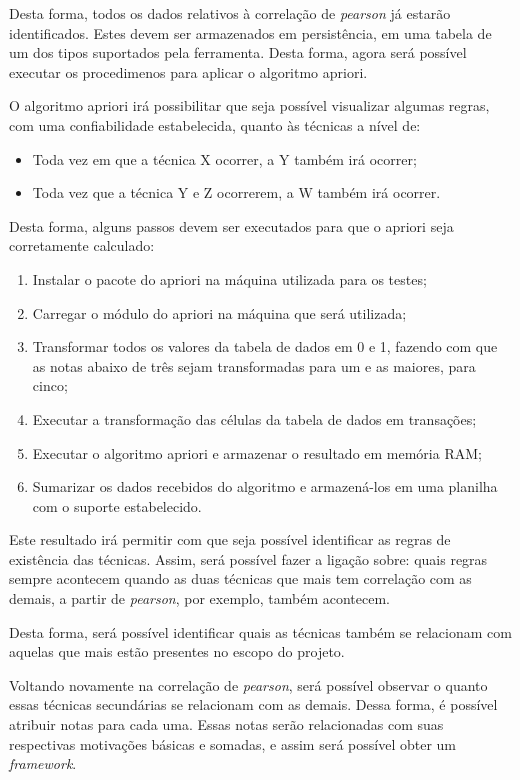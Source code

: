Desta forma, todos os dados relativos à correlação de \textit{pearson} já estarão identificados. Estes devem ser armazenados em persistência,
em uma tabela de um dos tipos suportados pela ferramenta. Desta forma, agora será possível executar os procedimenos para aplicar
o algoritmo apriori.

O algoritmo apriori irá possibilitar que seja possível visualizar algumas regras, com uma confiabilidade estabelecida,
quanto às técnicas a nível de:
\begin{itemize}
    \item Toda vez em que a técnica X ocorrer, a Y também irá ocorrer;
    \item Toda vez que a técnica Y e Z ocorrerem, a W também irá ocorrer.
\end{itemize}

Desta forma, alguns passos devem ser executados para que o apriori seja corretamente calculado:

\begin{enumerate}
    \item Instalar o pacote do apriori na máquina utilizada para os testes;
    \item Carregar o módulo do apriori na máquina que será utilizada;
    \item Transformar todos os valores da tabela de dados em 0 e 1, fazendo com que as notas abaixo de três
        sejam transformadas para um e as maiores, para cinco;
    \item Executar a transformação das células da tabela de dados em transações;
    \item Executar o algoritmo apriori e armazenar o resultado em memória RAM;
    \item Sumarizar os dados recebidos do algoritmo e armazená-los em uma planilha com o suporte
        estabelecido.
\end{enumerate}

Este resultado irá permitir com que seja possível identificar as regras de existência das técnicas. Assim, será possível fazer
a ligação sobre: quais regras sempre acontecem quando as duas técnicas que mais tem correlação com as demais, a partir de \textit{pearson},
por exemplo, também acontecem.


Desta forma, será possível identificar quais as técnicas também se relacionam com aquelas que mais estão presentes no escopo do
projeto.

Voltando novamente na correlação de \textit{pearson}, será possível observar o quanto essas técnicas secundárias se relacionam com as demais. 
Dessa forma, é possível atribuir notas para cada uma. Essas notas serão relacionadas com suas respectivas motivações básicas e somadas, e assim
será possível obter um \textit{framework}.

